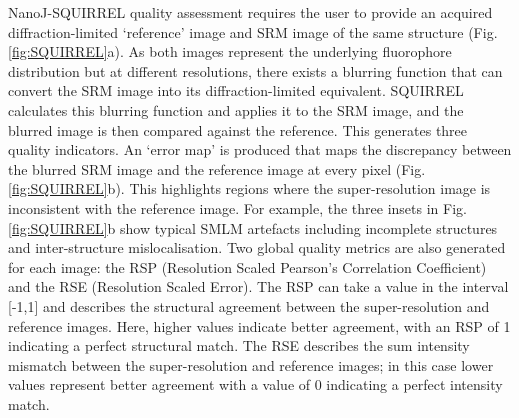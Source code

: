 NanoJ-SQUIRREL quality assessment requires the user to provide an acquired diffraction-limited `reference’ image and SRM image of the same structure (Fig. \ref{fig:SQUIRREL}a). As both images represent the underlying fluorophore distribution but at different resolutions, there exists a blurring function that can convert the SRM image into its diffraction-limited equivalent. SQUIRREL calculates this blurring function and applies it to the SRM image, and the blurred image is then compared against the reference. This generates three quality indicators. An `error map’ is produced that maps the discrepancy between the blurred SRM image and the reference image at every pixel (Fig. \ref{fig:SQUIRREL}b). This highlights regions where the super-resolution image is inconsistent with the reference image. For example, the three insets in Fig. \ref{fig:SQUIRREL}b show typical SMLM artefacts including incomplete structures and inter-structure mislocalisation.  Two global quality metrics are also generated for each image: the RSP (Resolution Scaled Pearson’s Correlation Coefficient) and the RSE (Resolution Scaled Error). The RSP can take a value in the interval [-1,1] and describes the structural agreement between the super-resolution and reference images. Here, higher values indicate better agreement, with an RSP of 1 indicating a perfect structural match. The RSE describes the sum intensity mismatch between the super-resolution and reference images; in this case lower values represent better agreement with a value of 0 indicating a perfect intensity match.


